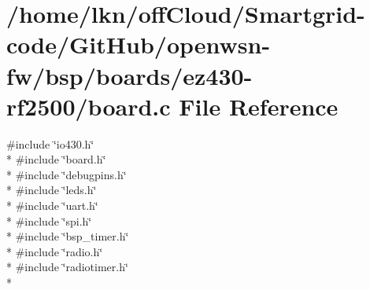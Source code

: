 \hypertarget{ez430-rf2500_2board_8c}{}\section{/home/lkn/off\+Cloud/\+Smartgrid-\/code/\+Git\+Hub/openwsn-\/fw/bsp/boards/ez430-\/rf2500/board.c File Reference}
\label{ez430-rf2500_2board_8c}
{\ttfamily \#include \char`\"{}io430.\+h\char`\"{}}\\*
{\ttfamily \#include \char`\"{}board.\+h\char`\"{}}\\*
{\ttfamily \#include \char`\"{}debugpins.\+h\char`\"{}}\\*
{\ttfamily \#include \char`\"{}leds.\+h\char`\"{}}\\*
{\ttfamily \#include \char`\"{}uart.\+h\char`\"{}}\\*
{\ttfamily \#include \char`\"{}spi.\+h\char`\"{}}\\*
{\ttfamily \#include \char`\"{}bsp\+\_\+timer.\+h\char`\"{}}\\*
{\ttfamily \#include \char`\"{}radio.\+h\char`\"{}}\\*
{\ttfamily \#include \char`\"{}radiotimer.\+h\char`\"{}}\\*
